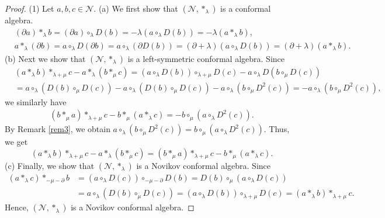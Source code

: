 \documentclass[11pt,letterpaper,reqno]{amsart}
\theoremstyle{definition}
\numberwithin{equation}{section}
\begin{document}
\begin{proof}
(1) Let $a,b,c \in \mathcal{N}$. (a) We first show that $(\mathcal{N} ,\ast_\lambda)$ is a conformal algebra.
   \begin{align*}
      &(\partial a)\ast_\lambda b=(\partial a)\circ_\lambda D(b)=-\lambda (a\circ_\lambda D(b))=-\lambda(a\ast_\lambda b), \\
      &a\ast_\lambda (\partial b)=a\circ_\lambda D(\partial b)=a\circ_\lambda (\partial D(b))=(\partial+\lambda) (a\circ_\lambda D(b))=(\partial+\lambda)(a\ast_\lambda b).
   \end{align*}
(b) Next we show that $(\mathcal{N} ,\ast_\lambda)$ is a left-symmetric conformal algebra. Since
   \begin{align*}
      &(a\ast_\lambda b)\ast_{\lambda+\mu}c-a\ast_\lambda(b\ast_\mu c)=(a\circ_\lambda D(b))\circ_{\lambda+\mu} D(c)-a\circ_\lambda D(b\circ_\mu D(c))  \\
      &=a\circ_\lambda (D(b)\circ_{\mu} D(c))-a\circ_\lambda (D(b)\circ_\mu D(c))-a\circ_\lambda (b\circ_\mu D^2(c))=-a\circ_\lambda (b\circ_\mu D^2(c)),
   \end{align*}
we similarly have
   \begin{align*}
        (b\ast_\mu a)\ast_{\lambda+\mu}c-b\ast_\mu(a\ast_\lambda c)=-b\circ_\mu (a\circ_\lambda D^2(c)).
   \end{align*}
By Remark \ref{rem3}, we obtain $a\circ_\lambda (b\circ_\mu D^2(c))=b\circ_\mu (a\circ_\lambda D^2(c)).$ Thus, we get
$$(a\ast_\lambda b)\ast_{\lambda+\mu}c-a\ast_\lambda(b\ast_\mu c)=(b\ast_\mu a)\ast_{\lambda+\mu}c-b\ast_\mu(a\ast_\lambda c).$$
(c) Finally, we show that $(\mathcal{N} ,\ast_\lambda)$ is a Novikov conformal algebra. Since
   \begin{align*}
      (a\ast_\lambda c)\ast_{-\mu-\partial}b&=(a\circ_\lambda D(c))\circ_{-\mu-\partial}D(b)=D(b)\circ_{\mu}(a\circ_\lambda D(c)) \\
      &=a\circ_\lambda(D(b)\circ_{\mu} D(c))=(a\circ_\lambda D(b))\circ_{\lambda+\mu} D(c)=(a\ast_\lambda b)\ast_{\lambda+\mu}c.
   \end{align*}
Hence, $(\mathcal{N} ,\ast_\lambda)$ is a Novikov conformal algebra.


\end{proof}
\end{document}
